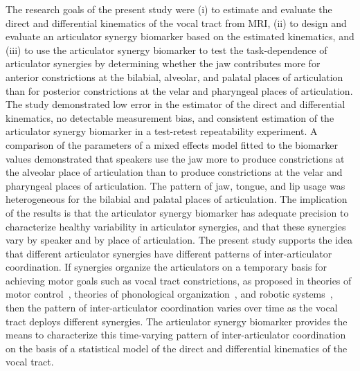 \documentclass[reprint]{JASAnew}\usepackage[]{graphicx}\usepackage[]{color}
\begin{document}
The research goals of the present study were (i) to estimate and evaluate the direct and differential kinematics of the vocal tract from MRI, 
%
(ii) to design and evaluate an articulator synergy biomarker based on the estimated kinematics, and
%
(iii) to use the articulator synergy biomarker to test the task-dependence of articulator synergies by determining whether the jaw contributes more for anterior constrictions at the bilabial, alveolar, and palatal places of articulation than for posterior constrictions at the velar and pharyngeal places of articulation.
%
The study demonstrated low error in the estimator of the direct and differential kinematics, no detectable measurement bias, and consistent estimation of the articulator synergy biomarker in a test-retest repeatability experiment.
%
A comparison of the parameters of a mixed effects model fitted to the biomarker values demonstrated that speakers use the jaw more to produce constrictions at the alveolar place of articulation than to produce constrictions at the velar and pharyngeal places of articulation. 
%
The pattern of jaw, tongue, and lip usage was heterogeneous for the bilabial and palatal places of articulation.
%
The implication of the results is that the articulator synergy biomarker has adequate precision to characterize healthy variability in articulator synergies, and that these synergies vary by speaker and by place of articulation. 
%
The present study supports the idea that different articulator synergies have different patterns of inter-articulator coordination. 
If synergies organize the articulators on a temporary basis for achieving motor goals such as vocal tract constrictions, as proposed in theories of motor control~\citep{turvey1977preliminaries, saltzman1987skilled}, theories of phonological organization~\citep{browman1986towards, browman1989articulatory}, and robotic systems~\citep{herbort2010sure}, then the pattern of inter-articulator coordination varies over time as the vocal tract deploys different synergies. 
The articulator synergy biomarker provides the means to characterize this time-varying pattern of inter-articulator coordination on the basis of a statistical model of the direct and differential kinematics of the vocal tract. 



\end{document}
